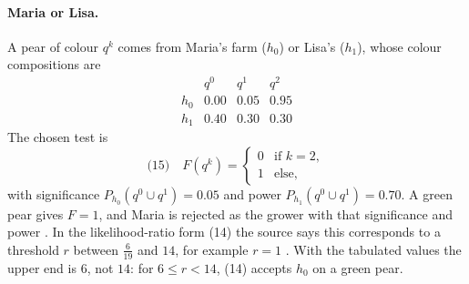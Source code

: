 \paragraph{Maria or Lisa.}
A pear of colour \(q^k\) comes from Maria's farm (\(h_0\)) or Lisa's
(\(h_1\)), whose colour compositions are
\[
 \begin{array}{c|ccc}
  & q^0 & q^1 & q^2\\\hline
  h_0 & 0.00 & 0.05 & 0.95\\
  h_1 & 0.40 & 0.30 & 0.30
 \end{array}
\]
The chosen test is
\[
 \text{(15)}\quad F(q^k)=\begin{cases}0&\text{if }k=2,\\1&\text{else,}\end{cases}
\]
with significance \(P_{h_0}(q^0\cup q^1)=0.05\) and power
\(P_{h_1}(q^0\cup q^1)=0.70\). A green pear gives \(F=1\), and Maria is
rejected as the grower with that significance and power
\cite[pp.~638--639]{Romeijn2011InductiveLogicStatistics}. In the
likelihood-ratio form (14) the source says this corresponds to a
threshold \(r\) between \(\tfrac{6}{19}\) and \(14\), for example
\(r=1\) \cite[p.~639]{Romeijn2011InductiveLogicStatistics}. With the
tabulated values the upper end is \(6\), not \(14\): for
\(6\le r<14\), (14) accepts \(h_0\) on a green pear.

